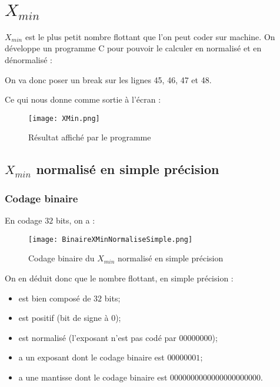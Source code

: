 \documentclass[a4paper, titlepage]{livret} %
\begin{document}
		\section{$X_{min}$}
			$X_{min}$ est le plus petit nombre flottant que l'on peut coder sur machine.
			On développe un programme C pour pouvoir le calculer en normalisé et en dénormalisé :
			
			On va donc poser un break sur les lignes 45, 46, 47 et 48.

			Ce qui nous donne comme sortie à l'écran :
			\begin{figure}[!h]
				\centering
  					\texttt{[image: XMin.png]}
  					\caption{Résultat affiché par le programme}
			\end{figure}

			\subsection{$X_{min}$ normalisé en simple précision}
				\subsubsection{Codage binaire}
					En codage $32$ bits, on a :
					\begin{figure}[!h]
						\centering
  							\texttt{[image: BinaireXMinNormaliseSimple.png]}
  							\caption{Codage binaire du $X_{min}$ normalisé en simple précision}
					\end{figure}

					On en déduit donc que le nombre flottant, en simple précision :
					\begin{itemize}
						\item est bien composé de $32$ bits;
						\item est positif (bit de signe à 0);
						\item est normalisé (l'exposant n'est pas codé par $00000000$);
						\item a un exposant dont le codage binaire est $00000001$;
						\item a une mantisse dont le codage binaire est $00000000 00000000 000000$.
					\end{itemize}
\end{document}
